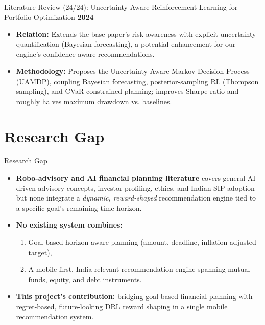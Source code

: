 \documentclass{beamer}
\begin{document}
\begin{frame}{Literature Review (24/24): Uncertainty-Aware Reinforcement Learning for Portfolio Optimization}
\small
\textbf{2024}
\begin{itemize}
    \item \textbf{Relation:} Extends the base paper's risk-awareness with explicit uncertainty quantification (Bayesian forecasting), a potential enhancement for our engine's confidence-aware recommendations.
    \item \textbf{Methodology:} Proposes the Uncertainty-Aware Markov Decision Process (UAMDP), coupling Bayesian forecasting, posterior-sampling RL (Thompson sampling), and CVaR-constrained planning; improves Sharpe ratio and roughly halves maximum drawdown vs. baselines.
\end{itemize}
\end{frame}

\section{Research Gap}

\begin{frame}{Research Gap}
\small
\begin{itemize}
    \item \textbf{Robo-advisory and AI financial planning literature} covers general AI-driven advisory concepts, investor profiling, ethics, and Indian SIP adoption -- but none integrate a \emph{dynamic, reward-shaped} recommendation engine tied to a specific goal's remaining time horizon.
    \item \textbf{No existing system combines:}
    \begin{enumerate}
        \item Goal-based horizon-aware planning (amount, deadline, inflation-adjusted target),
        \item A mobile-first, India-relevant recommendation engine spanning mutual funds, equity, and debt instruments.
    \end{enumerate}
    \item \textbf{This project's contribution:} bridging goal-based financial planning with regret-based, future-looking DRL reward shaping in a single mobile recommendation system.
\end{itemize}
\end{frame}

\end{document}
